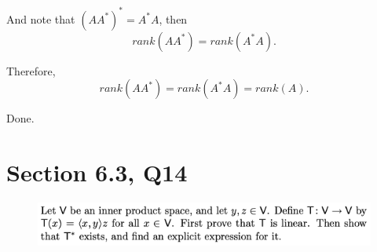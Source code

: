 \documentclass[12pt]{article}%
\begin{document}
And note that $(AA^*)^* =A^*A$, then $$rank(AA^*)=rank(A^*A).$$

Therefore, $$rank(AA^*)=rank(A^*A)=rank(A).$$

Done.




\newpage

\section{Section 6.3, Q14}
\begin{figure}[htp]
    \centering %
    \includegraphics[width = 16cm]{img/Q3.png}
\end{figure}
\end{document}
